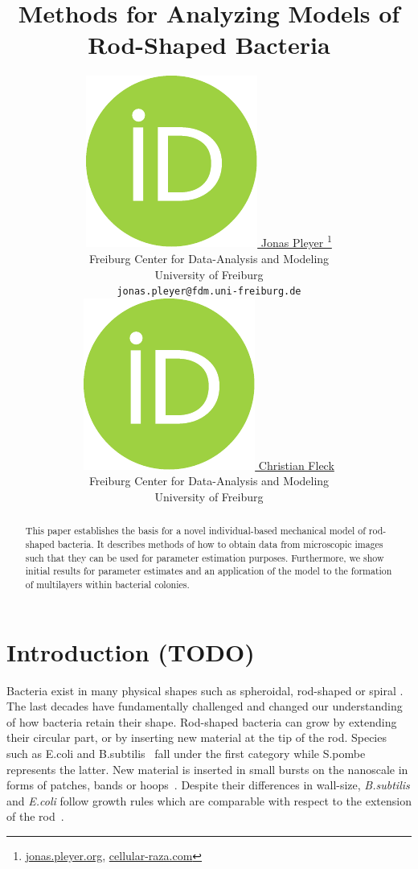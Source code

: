\documentclass{article}
\title{Methods for Analyzing Models of Rod-Shaped Bacteria}
\author{
    \href{https://orcid.org/0009-0001-0613-7978}{
        \includegraphics[scale=0.06]{figures/orcid.pdf}
        \hspace{1mm}Jonas Pleyer
    }
    \thanks{
        \href{https://jonas.pleyer.org}{jonas.pleyer.org},
        \href{https://cellular-raza.com}{cellular-raza.com}
    }\\
	Freiburg Center for Data-Analysis and Modeling\\
	University of Freiburg\\
	\texttt{jonas.pleyer@fdm.uni-freiburg.de} \\
	\And
	\href{https://orcid.org/0000-0002-6371-4495}{
        \includegraphics[scale=0.06]{figures/orcid.pdf}
        \hspace{1mm}Christian Fleck
    }\\
	Freiburg Center for Data-Analysis and Modeling\\
	University of Freiburg
}
\begin{document}
\maketitle

\begin{abstract}
    This paper establishes the basis for a novel individual-based mechanical model of rod-shaped
    bacteria.
    It describes methods of how to obtain data from microscopic images such that they can be used
    for parameter estimation purposes.
    Furthermore, we show initial results for parameter estimates and an application of the model to
    the formation of multilayers within bacterial colonies.
\end{abstract}


\pagebreak
\renewcommand{\contentsname}{Table of Contents (remove before submission)}
\tableofcontents
\pagebreak

\section{Introduction (TODO)}
\label{section:introduction}

Bacteria exist in many physical shapes such as spheroidal, rod-shaped or spiral
\cite{Zapun2008,Young2006}.
The last decades have fundamentally challenged and changed our understanding of how bacteria retain
their shape.
Rod-shaped bacteria can grow by extending their circular part, or by inserting new material at the
tip of the rod.
Species such as E.coli and B.subtilis~\cite{Errington2020} fall under the first category while
S.pombe represents the latter.
New material is inserted in small bursts on the nanoscale in forms of patches, bands or
hoops~\cite{DePedro2003}.
Despite their differences in wall-size, \textit{B.subtilis} and \textit{E.coli} follow growth rules
which are comparable with respect to the extension of the rod~\cite{Chang2014}.
\end{document}
